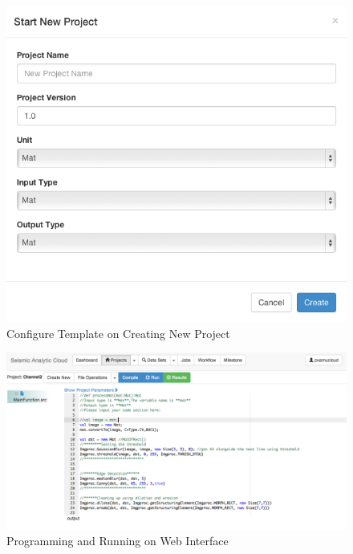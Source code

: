 \begin{figure}[H]
\includegraphics[scale=.60]{figures/NewProject.png}
\caption{Configure Template on Creating New Project}
\label{NewProject}
\end{figure}

\begin{figure}[H]
\centering
\includegraphics[scale=.35]{figures/Programming.png}
\caption{Programming and Running on Web Interface}
\label{Programming}
\end{figure}



